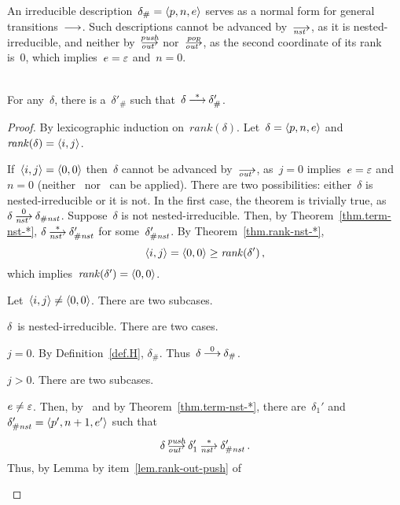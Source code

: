 An irreducible description~$\delta_\#=\<p,n,e>$ serves as a normal form for
general transitions~$\trans$.  Such descriptions cannot be advanced
by~$\nst$, as it is nested-irreducible, and neither by~$\outpush$
nor~$\outpop$, as the second coordinate of its rank is~0, which
implies~$e=\varepsilon$ and~$n=0$.


\begin{theorem}[Termination]\label{thm.term}\strut\\
  For any~$\delta$, there is a~$\delta'_\#$ such
  that~$\delta\trans[*]\delta'_\#$.
\end{theorem}
\begin{proof}
  By lexicographic induction on~$rank(\delta)$.  Let~$\delta=\<p,n,e>$ and
  $\rank(\delta)=\<i,j>$.
  \begin{basis}
    If~$\<i,j>=\<0,0>$ then~$\delta$ cannot be advanced by~$\out$, as~$j=0$
    implies~$e=\varepsilon$ and~$n=0$ (neither~ nor~ can be
    applied).  There are two possibilities:  either~$\delta$ is
    nested-irreducible or it is not.  In the first case, the theorem is
    trivially true, as~$\delta\nst[0]\delta_\Hnst$.  Suppose~$\delta$ is not
    nested-irreducible.  Then, by Theorem~\ref{thm.term-nst-*},
    $\delta\nst[*]\delta'_\Hnst$ for some~$\delta'_{\#\mathit{nst}}$.  By
    Theorem~\ref{thm.rank-nst-*},
    \[
      \<i,j>=\<0,0>\ge\rank(\delta')\,,
    \]
    which implies~$\rank(\delta')=\<0,0>$.
  \end{basis}
  \begin{induction}
    Let~$\<i,j>\ne\<0,0>$.
    There are two subcases.
    \begin{case}
      \label{thm.term.Hnst}
      $\delta$~is nested-irreducible.
      There are two cases.
      \begin{subcase}
        \label{thm.term.Hnst-j0}
        $j=0$.  By Definition~\ref{def.H}, $\delta_\#$.
        Thus~$\delta\trans[0]\delta_\#$.
      \end{subcase}
      \begin{subcase}
        \label{thm.term.Hnst-j>0}
        $j>0$.
        There are two subcases.
        \begin{subsubcase}
          \label{thm.term.Hnst-j>0-nonnil}
          $e\ne\varepsilon$.
          Then, by~ and by Theorem~\ref{thm.term-nst-*}, there
          are~$\delta_1'$ and~$\delta'_\Hnst=\<p',n+1,e'>$ such that
          \[
            \delta\outpush\delta_1'\nst[*]\delta'_\Hnst\,.
          \]
          Thus, by Lemma by item~\eqref{lem.rank-out-push} of

\end{subsubcase}
\end{subcase}
\end{case}
\end{induction}
\end{proof}
